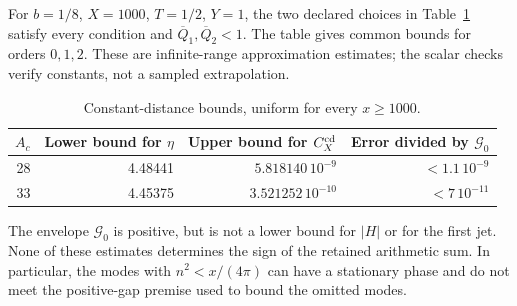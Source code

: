 For $b=1/8$, $X=1000$, $T=1/2$, $Y=1$, the two declared choices
in Table~\ref{tab:effective-tails} satisfy every condition and
$\overline Q_1,\overline Q_2<1$. The table gives common bounds for
orders $0,1,2$. These are infinite-range approximation estimates;
the scalar checks verify constants, not a sampled extrapolation.

\begin{table}[htbp]
\centering
\caption{Constant-distance bounds, uniform for every $x\ge1000$.}
\label{tab:effective-tails}
\begin{tabular}{@{}rrrr@{}}
\toprule
$A_c$ & Lower bound for $\eta$ & Upper bound for $C_X^{\rm cd}$
 & Error divided by $\mathcal G_0$\\
\midrule
28 & 4.48441 & $5.818140\,10^{-9}$ & $<1.1\,10^{-9}$\\
33 & 4.45375 & $3.521252\,10^{-10}$ & $<7\,10^{-11}$\\
\bottomrule
\end{tabular}
\end{table}

The envelope $\mathcal G_0$ is positive, but is not a lower bound for
$|H|$ or for the first jet. None of these estimates determines the sign
of the retained arithmetic sum. In particular, the modes with
$n^2<x/(4\pi)$ can have a stationary phase and do not meet the
positive-gap premise used to bound the omitted modes.
